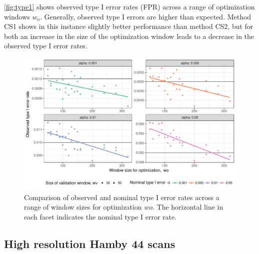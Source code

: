 \documentclass[12pt]{article}
\begin{document}
\autoref{fig:type1} shows observed type I error rates (FPR) across a
range of optimization windows \(w_o\). Generally, observed type I errors
are higher than expected. Method CS1 shows in this instance slightly
better performance than method CS2, but for both an increase in the size
of the optimization window leads to a decrease in the observed type I
error rates.

\begin{figure}

{\centering \includegraphics[width=\textwidth]{figures/type1-1} 

}

\caption{Comparison of observed and nominal type I error rates  across a range of window sizes for optimization $wo$. The horizontal line in each facet indicates the nominal type I error rate.}\label{fig:type1}
\end{figure}

\hypertarget{high-resolution-hamby-44-scans}{%
\subsection{High resolution Hamby 44
scans}\label{high-resolution-hamby-44-scans}}
\end{document}
